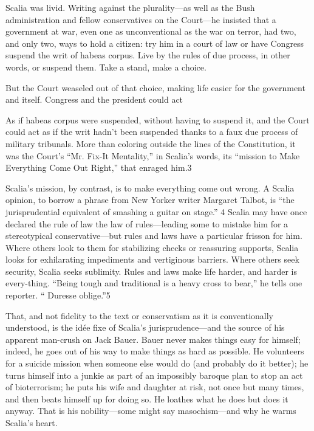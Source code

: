  \par 
Scalia was livid. Writing against the plurality—as well as the Bush administration and fellow conservatives on the Court—he insisted that a government at war, even one as unconventional as the war on terror, had two, and only two, ways to hold a citizen: try him in a court of law or have Congress suspend the writ of habeas corpus. Live by the rules of due process, in other words, or suspend them. Take a stand, make a choice.
 \par 
But the Court weaseled out of that choice, making life easier for the government and itself. Congress and the president could act
 \par 
As if habeas corpus were suspended, without having to suspend it, and the Court could act as if the writ hadn’t been suspended thanks to a faux due process of military tribunals. More than coloring outside the lines of the Constitution, it was the Court’s “Mr. Fix-It Mentality,” in Scalia’s words, its “mission to Make Everything Come Out Right,” that enraged him.{\color{blue}3}
 \par 
Scalia’s mission, by contrast, is to make everything come out wrong. A Scalia opinion, to borrow a phrase from New Yorker writer Margaret Talbot, is “the jurisprudential equivalent of smashing a guitar on stage.” {\color{blue}4} Scalia may have once declared the rule of law the law of rules—leading some to mistake him for a stereotypical conservative—but rules and laws have a particular frisson for him. Where others look to them for stabilizing checks or reassuring supports, Scalia looks for exhilarating impediments and vertiginous barriers. Where others seek security, Scalia seeks sublimity. Rules and laws make life harder, and harder is every-thing. “Being tough and traditional is a heavy cross to bear,” he tells one reporter. “ Duresse oblige.”{\color{blue}5}
 \par 
That, and not fidelity to the text or conservatism as it is conventionally understood, is the idée fixe of Scalia’s jurisprudence—and the source of his apparent man-crush on Jack Bauer. Bauer never makes things easy for himself; indeed, he goes out of his way to make things as hard as possible. He volunteers for a suicide mission when someone else would do (and probably do it better); he turns himself into a junkie as part of an impossibly baroque plan to stop an act of bioterrorism; he puts his wife and daughter at risk, not once but many times, and then beats himself up for doing so. He loathes what he does but does it anyway. That is his nobility—some might say masochism—and why he warms Scalia’s heart.
